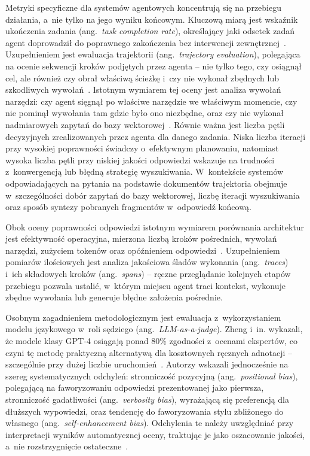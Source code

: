 Metryki specyficzne dla systemów agentowych koncentrują się na przebiegu
działania, a~nie tylko na jego wyniku końcowym. Kluczową miarą jest wskaźnik
ukończenia zadania (ang.~\textit{task completion rate}), określający jaki
odsetek zadań agent doprowadził do poprawnego zakończenia bez interwencji
zewnętrznej~\cite{liu2023agentbench}. Uzupełnieniem jest ewaluacja trajektorii
(ang.~\textit{trajectory evaluation}), polegająca na ocenie sekwencji kroków
podjętych przez agenta -- nie tylko tego, czy osiągnął cel, ale również czy
obrał właściwą ścieżkę i~czy nie wykonał zbędnych lub szkodliwych
wywołań~\cite{wang2024survey}. Istotnym wymiarem tej oceny jest analiza wywołań
narzędzi: czy agent sięgnął po właściwe narzędzie we właściwym momencie, czy
nie pominął wywołania tam gdzie było ono niezbędne, oraz czy nie wykonał
nadmiarowych zapytań do bazy wektorowej~\cite{patil2024gorilla,
  liu2023agentbench}. Równie ważna jest liczba pętli decyzyjnych zrealizowanych
przez agenta dla danego zadania. Niska liczba iteracji przy wysokiej
poprawności świadczy o~efektywnym planowaniu, natomiast wysoka liczba pętli
przy niskiej jakości odpowiedzi wskazuje na trudności z~konwergencją lub błędną
strategię wyszukiwania. W~kontekście systemów odpowiadających na pytania na
podstawie dokumentów trajektoria obejmuje w~szczególności dobór zapytań do bazy
wektorowej, liczbę iteracji wyszukiwania oraz sposób syntezy pobranych
fragmentów w~odpowiedź końcową.

Obok oceny poprawności odpowiedzi istotnym wymiarem porównania architektur jest
efektywność operacyjna, mierzona liczbą kroków pośrednich, wywołań narzędzi,
zużyciem tokenów oraz opóźnieniem odpowiedzi~\cite{wang2024survey}.
Uzupełnieniem pomiarów ilościowych jest analiza jakościowa śladów wykonania
(ang.~\textit{traces}) i~ich składowych kroków (ang.~\textit{spans}) -- ręczne
przeglądanie kolejnych etapów przebiegu pozwala ustalić, w~którym miejscu agent
traci kontekst, wykonuje zbędne wywołania lub generuje błędne założenia
pośrednie.

Osobnym zagadnieniem metodologicznym jest ewaluacja z~wykorzystaniem modelu
językowego w~roli sędziego (ang.~\textit{LLM-as-a-judge}). Zheng i~in.
wykazali, że modele klasy GPT-4 osiągają ponad 80\% zgodności z~ocenami
ekspertów, co czyni tę metodę praktyczną alternatywą dla kosztownych ręcznych
adnotacji -- szczególnie przy dużej liczbie uruchomień~\cite{zheng2023judging}.
Autorzy wskazali jednocześnie na szereg systematycznych odchyleń: stronniczość
pozycyjną (ang.~\textit{positional bias}), polegającą na faworyzowaniu
odpowiedzi prezentowanej jako pierwsza, stronniczość gadatliwości
(ang.~\textit{verbosity bias}), wyrażającą się preferencją dla dłuższych
wypowiedzi, oraz tendencję do faworyzowania stylu zbliżonego do własnego
(ang.~\textit{self-enhancement bias}). Odchylenia te należy uwzględniać przy
interpretacji wyników automatycznej oceny, traktując je jako oszacowanie
jakości, a~nie rozstrzygnięcie ostateczne~\cite{panickssery2404llm}.

